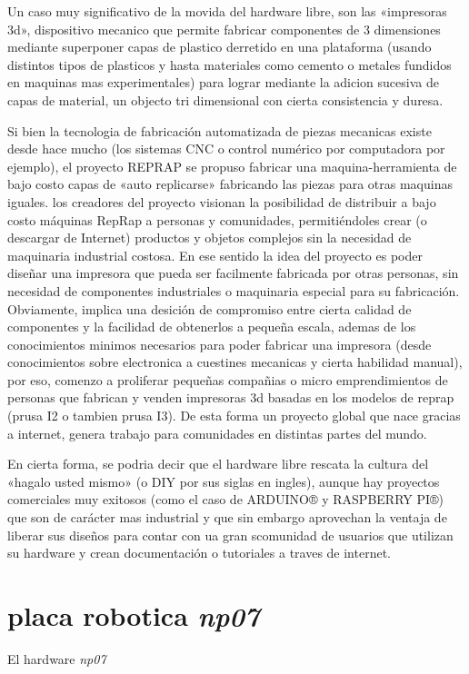 \documentclass[letterpaper,10pt,english]{sphinxmanual}
\begin{document}
Un caso muy significativo de la movida del hardware libre, son las
«impresoras 3d», dispositivo mecanico que permite fabricar componentes
de 3 dimensiones mediante superponer capas de plastico derretido en una
plataforma (usando distintos tipos de plasticos y hasta materiales
como cemento o metales fundidos en maquinas mas experimentales)
para lograr mediante la adicion sucesiva de capas de material, un
objecto tri dimensional con cierta consistencia y duresa.

Si bien la tecnologia de fabricación automatizada de piezas mecanicas
existe desde hace mucho (los sistemas CNC o control numérico por
computadora por ejemplo), el proyecto REPRAP se propuso fabricar una
maquina-herramienta de bajo costo capas de «auto replicarse» fabricando
las piezas para otras maquinas iguales. los creadores del proyecto
visionan la posibilidad de distribuir a bajo costo máquinas RepRap a
personas y comunidades, permitiéndoles crear (o descargar de Internet)
productos y objetos complejos sin la necesidad de maquinaria
industrial costosa. En ese sentido la idea del proyecto es poder
diseñar una impresora que pueda ser facilmente fabricada
por otras personas, sin necesidad de componentes industriales o
maquinaria especial para su fabricación. Obviamente, implica
una desición de compromiso entre cierta calidad de componentes y la
facilidad de obtenerlos a pequeña escala, ademas de los
conocimientos minimos necesarios para poder fabricar una impresora
(desde conocimientos sobre electronica a cuestines mecanicas
y cierta habilidad manual), por eso, comenzo a proliferar pequeñas
compañias o micro emprendimientos de personas que fabrican y
venden impresoras 3d basadas en los modelos de reprap (prusa I2 o
tambien prusa I3). De esta forma un proyecto global que nace
gracias a internet, genera trabajo para comunidades en distintas
partes del mundo.

En cierta forma, se podria decir que el hardware libre rescata la
cultura del «hagalo usted mismo»
(o DIY por sus siglas en ingles), aunque hay proyectos comerciales muy
exitosos (como el caso de ARDUINO® y RASPBERRY PI®)
que son de carácter mas industrial y que sin embargo aprovechan
la ventaja de liberar sus diseños para contar con ua gran
scomunidad de usuarios que utilizan su hardware y crean documentación o
tutoriales a traves de internet.


\chapter{placa robotica \emph{np07}}
\label{np07:placa-robotica-pcb}\label{np07::doc}
El hardware \emph{np07}
\end{document}
